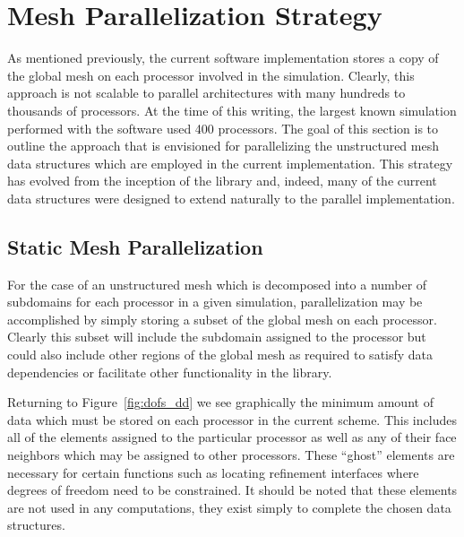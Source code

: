 \section{Mesh Parallelization Strategy\label{sec:parallelization_strategy}}
As mentioned previously, the current software implementation stores a copy of the global mesh on each processor involved in the simulation.  Clearly, this approach is not scalable to parallel architectures with many hundreds to thousands of processors.  At the time of this writing, the largest known simulation performed with the \libMesh{} software used 400 processors.  The goal of this section is to outline the approach that is envisioned for parallelizing the unstructured mesh data structures which are employed in the current implementation.  This strategy has evolved from the inception of the library and, indeed, many of the current data structures were designed to extend naturally to the parallel implementation.

\subsection{Static Mesh Parallelization}
For the case of an unstructured mesh which is decomposed into a number of subdomains for each processor in a given simulation, parallelization may be accomplished by simply storing a subset of the global mesh on each processor.  Clearly this subset will include the subdomain assigned to the processor but could also include other regions of the global mesh as required to satisfy data dependencies or facilitate other functionality in the library.

Returning to Figure~\ref{fig:dofs_dd} we see graphically the minimum amount of data which must be stored on each processor in the current scheme.  This includes all of the elements assigned to the particular processor as well as any of their face neighbors which may be assigned to other processors.  These ``ghost'' elements are necessary for certain functions such as locating refinement interfaces where degrees of freedom need to be constrained.  It should be noted that these elements are not used in any computations, they exist simply to complete the chosen data structures.

